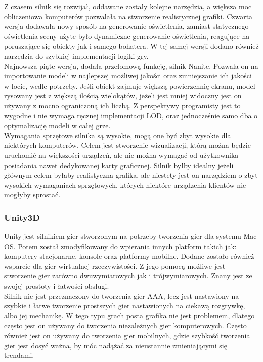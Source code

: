 \documentclass{article} %
\begin{document}
        Z czasem silnik się rozwijał, oddawane zostały kolejne narzędzia, a większa moc obliczeniowa komputerów pozwalała na stworzenie realistycznej grafiki. Czwarta wersja dodawała nowy sposób na generowanie oświetlenia, zamiast statycznego oświetlenia sceny użyte było dynamiczne generowanie oświetlenia, reagujące na poruszające się obiekty jak i samego bohatera. W tej samej wersji dodano również narzędzia do szybkiej implementacji logiki gry.
        \\
        
        Najnowsza piąte wersja, dodała przełomową funkcję, silnik Nanite. Pozwala on na importowanie modeli w najlepszej możliwej jakości oraz zmniejszanie ich jakości w locie, wedle potrzeby. Jeśli obiekt zajmuje większą powierzchnię ekranu, model rysowany jest z większą ilością wielokątów, jeżeli jest mniej widoczny jest on używany z mocno ograniczoną ich liczbą. Z perspektywy programisty jest to wygodne i nie wymaga ręcznej implementacji LOD, oraz jednocześnie samo dba o optymalizację modeli w całej grze.
        \\
        
        Wymagania sprzętowe silnika są wysokie, mogą one być zbyt wysokie dla niektórych komputerów. Celem jest stworzenie wizualizacji, którą można będzie uruchomić na większości urządzeń, ale nie można wymagać od użytkownika posiadania nawet dedykowanej karty graficznej. Silnik byłby idealny jeżeli głównym celem byłaby realistyczna grafika, ale niestety jest on narzędziem o zbyt wysokich wymaganiach sprzętowych, których niektóre urządzenia klientów nie mogłyby sprostać.
        \\
        
        \subsubsection*{Unity3D}
        Unity jest silnikiem gier stworzonym na potrzeby tworzenia gier dla systemu Mac OS. Potem został zmodyfikowany do wpierania innych platform takich jak: komputery stacjonarne, konsole oraz platformy mobilne. Dodane zostało również wsparcie dla gier wirtualnej rzeczywistości. Z jego pomocą możliwe jest stworzenie gier zarówno dwuwymiarowych jak i trójwymiarowych. Znany jest ze swojej prostoty i łatwości obsługi.
        \\
        
        Silnik nie jest przeznaczony do tworzenia gier AAA, lecz jest nastawiony na szybkie i łatwe tworzenie prostszych gier nastawionych na ciekawą rozgrywkę, albo jej mechanikę. W tego typu grach posta grafika nie jest problemem, dlatego często jest on używany do tworzenia niezależnych gier komputerowych. Często również jest on używany do tworzenia gier mobilnych, gdzie szybkość tworzenia gier jest dosyć ważna, by móc nadążać za nieustannie zmieniającymi się trendami.
        \\
        
\end{document}
